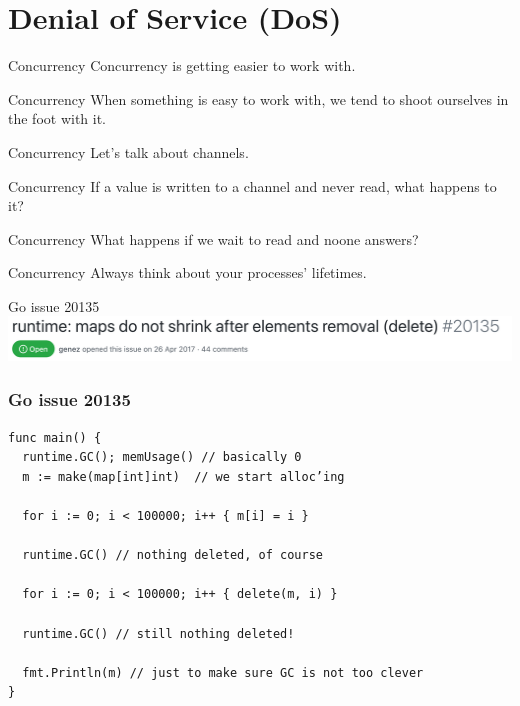 \documentclass[aspectratio=169,14pt]{beamer}
\begin{document}
  \section{Denial of Service (DoS)}
  \begin{frame}{Concurrency}
    Concurrency is getting easier to work with.
  \end{frame}
  \begin{frame}{Concurrency}
    When something is easy to work with, we tend to shoot ourselves in the
    foot with it.
  \end{frame}
  \begin{frame}{Concurrency}
    Let’s talk about channels.
  \end{frame}
  \begin{frame}{Concurrency}
    If a value is written to a channel and never read, what happens to it?
  \end{frame}
  \begin{frame}{Concurrency}
    What happens if we wait to read and noone answers?
  \end{frame}
  \begin{frame}{Concurrency}
    Always think about your processes’ lifetimes.
  \end{frame}
  \begin{frame}{Go issue 20135}
    \includegraphics[width=14cm]{go_20135}
  \end{frame}
  \begin{frame}[fragile]
    \frametitle{Go issue 20135}
    \begin{listing}[H]
      \caption{Go sitting on your memory.}
      \begin{verbatim}
func main() {
  runtime.GC(); memUsage() // basically 0
  m := make(map[int]int)  // we start alloc’ing

  for i := 0; i < 100000; i++ { m[i] = i }

  runtime.GC() // nothing deleted, of course

  for i := 0; i < 100000; i++ { delete(m, i) }

  runtime.GC() // still nothing deleted!

  fmt.Println(m) // just to make sure GC is not too clever
}
      \end{verbatim}
    \end{listing}
  \end{frame}
\end{document}
